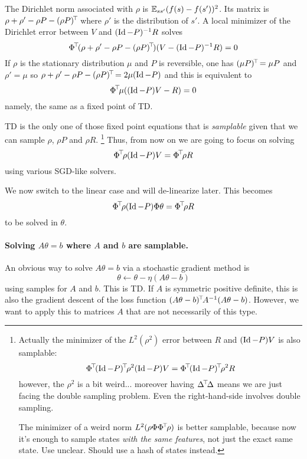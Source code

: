 \documentclass[11pt,a4paper]{article}
\begin{document}
The Dirichlet norm associated with $\rho$ is $\mathbb{E}_{ss'}
(f(s)-f(s'))^2$. Its matrix is $\rho+\rho'-\rho P-(\rho P)^{\!\top}\!$ where
$\rho'$ is the distribution of $s'$.
A local minimizer of the Dirichlet error between $V$ and
$(\operatorname{Id}-P)^{-1}R$ solves
\begin{equation}
\Phi^{\!\top}\! (\rho+\rho'-\rho P-(\rho P)^{\!\top}\!)(V-(\operatorname{Id}-P)^{-1}R)=0
\end{equation}
If $\rho$ is the stationary distribution $\mu$ and $P$ is reversible, one
has $(\mu P)^{\!\top}\!=\mu P$ and $\rho'=\mu$ so $\rho+\rho'-\rho P-(\rho
P)^{\!\top}\!=2\mu(\operatorname{Id}-P)$ and this is equivalent to
\begin{equation}
\Phi^{\!\top}\!\mu ((\operatorname{Id}-P)V-R)=0
\end{equation}
namely, the same as a fixed point of TD.

\bigskip

TD is the only one of those fixed point equations that is
\emph{samplable} given that we can sample $\rho$, $\rho P$ and $\rho R$.
\footnote{Actually the minimizer of the $L^2(\rho^2)$ error between $R$
and $(\operatorname{Id}-P)V$ is also samplable:
\begin{equation}
\transp{\Phi}\transp{(\Id-P)}\rho^2(\Id-P)V=\transp{\Phi}\transp{(\Id-P)}\rho^2
R
\end{equation}
however, the $\rho^2$ is a bit weird... moreover having
$\Delta^{\!\top}\!\Delta$ means we are just facing the double sampling
problem. Even the right-hand-side involves double sampling.

The minimizer of a weird norm $L^2(\rho \Phi\Phi^{\!\top}\!\rho)$ is better
samplable, because now it's enough to sample states \emph{with the same
features}, not just the exact same state. Use unclear. Should use a hash
of states instead.
}
Thus, from now on we are going to focus on solving
\begin{equation}
\Phi^{\!\top}\!\rho (\operatorname{Id}-P)V=\Phi^{\!\top}\!\rho R
\end{equation}
using various SGD-like solvers.

We now switch to the linear case and will de-linearize later. This
becomes
\begin{equation}
\Phi^{\!\top}\!\rho (\operatorname{Id}-P)\Phi \theta=\Phi^{\!\top}\!\rho R
\end{equation}
to be solved in $\theta$.

\paragraph{Solving $A\theta=b$ where $A$ and $b$ are samplable.} An
obvious way to solve $A\theta=b$ via a stochastic gradient method is
\begin{equation}
\theta\gets \theta - \eta (A\theta-b)
\end{equation}
using samples for $A$ and $b$.
This is TD. If $A$ is symmetric positive definite, this is also the
gradient descent of the loss function
$(A\theta-b)^{\!\top}\!A^{-1}(A\theta-b)$. However, we want to apply this
to matrices $A$ that are not necessarily of this type.
\end{document}
